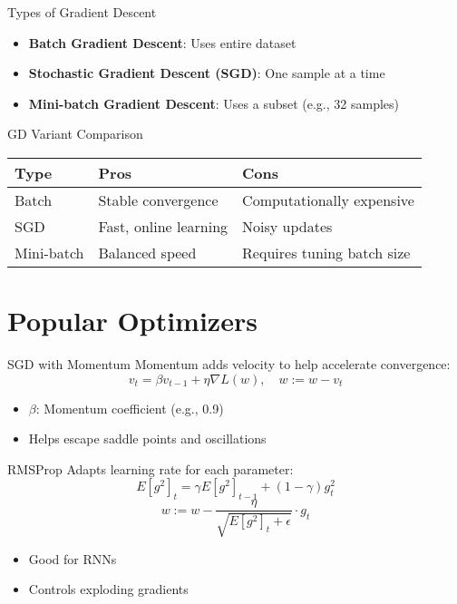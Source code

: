 \documentclass{beamer}
\begin{document}
\begin{frame}{Types of Gradient Descent}
\begin{itemize}
    \item \textbf{Batch Gradient Descent}: Uses entire dataset
    \item \textbf{Stochastic Gradient Descent (SGD)}: One sample at a time
    \item \textbf{Mini-batch Gradient Descent}: Uses a subset (e.g., 32 samples)
\end{itemize}
\end{frame}

\begin{frame}{GD Variant Comparison}
\footnotesize
\begin{tabular}{@{}lll@{}}
\toprule
\textbf{Type} & \textbf{Pros} & \textbf{Cons} \\
\midrule
Batch & Stable convergence & Computationally expensive \\
SGD & Fast, online learning & Noisy updates \\
Mini-batch & Balanced speed & Requires tuning batch size \\
\bottomrule
\end{tabular}
\end{frame}

\section{Popular Optimizers}
\begin{frame}{SGD with Momentum}
Momentum adds velocity to help accelerate convergence:
\[
v_t = \beta v_{t-1} + \eta \nabla L(w), \quad w := w - v_t
\]
\begin{itemize}
    \item \( \beta \): Momentum coefficient (e.g., 0.9)
    \item Helps escape saddle points and oscillations
\end{itemize}
\end{frame}

\begin{frame}{RMSProp}
Adapts learning rate for each parameter:
\[
E[g^2]_t = \gamma E[g^2]_{t-1} + (1-\gamma)g_t^2
\]
\[
w := w - \frac{\eta}{\sqrt{E[g^2]_t + \epsilon}} \cdot g_t
\]
\begin{itemize}
    \item Good for RNNs
    \item Controls exploding gradients
\end{itemize}
\end{frame}
\end{document}
